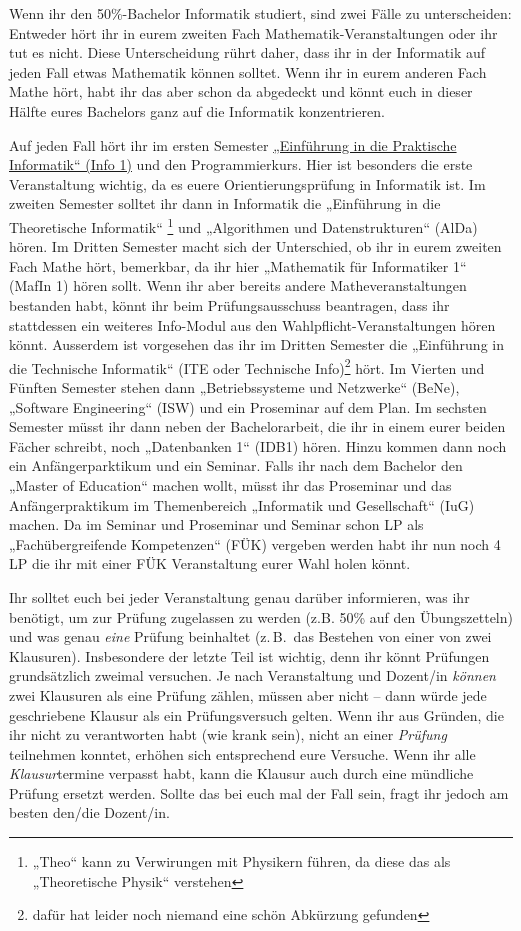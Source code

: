 Wenn ihr den 50\%-Bachelor Informatik studiert, sind zwei Fälle zu
unterscheiden: Entweder hört ihr in eurem zweiten Fach
Mathematik-Veranstaltungen oder ihr tut es nicht. Diese Unterscheidung rührt
daher, dass ihr in der Informatik auf jeden Fall etwas Mathematik können
solltet. Wenn ihr in eurem anderen Fach Mathe hört, habt ihr das aber schon da
abgedeckt und könnt euch in dieser Hälfte eures Bachelors ganz auf die
Informatik konzentrieren.

Auf jeden Fall hört ihr im ersten Semester \hyperref[info1]{„Einführung in die
Praktische Informatik“ (Info 1)} und den Programmierkurs. Hier ist besonders
die erste Veranstaltung wichtig, da es euere Orientierungsprüfung in Informatik
ist. Im zweiten Semester solltet ihr dann in Informatik die „Einführung in die
Theoretische Informatik“ \footnote{„Theo“ kann zu Verwirungen mit Physikern
führen, da diese das als „Theoretische Physik“ verstehen} und „Algorithmen und
Datenstrukturen“ (AlDa) hören. Im Dritten Semester macht sich der Unterschied,
ob ihr in eurem zweiten Fach Mathe hört, bemerkbar, da ihr hier
„Mathematik für Informatiker 1“ (MafIn 1)  hören sollt.  Wenn ihr aber bereits
andere Matheveranstaltungen bestanden habt, könnt ihr beim Prüfungsausschuss
beantragen, dass ihr stattdessen ein weiteres Info-Modul aus den
Wahlpflicht-Veranstaltungen hören könnt.  Ausserdem ist vorgesehen das ihr im
Dritten Semester die „Einführung in die Technische Informatik“ (ITE oder
Technische Info)\footnote{dafür hat leider noch niemand eine schön Abkürzung
gefunden} hört.  Im Vierten und Fünften Semester stehen dann „Betriebssysteme
und Netzwerke“ (BeNe), „Software Engineering“ (ISW) und ein Proseminar auf dem
Plan. Im sechsten Semester müsst ihr dann neben der Bachelorarbeit, die ihr in
einem eurer beiden Fächer schreibt, noch „Datenbanken 1“ (IDB1) hören. Hinzu
kommen dann noch ein Anfängerparktikum und ein Seminar. Falls ihr nach dem
Bachelor den „Master of Education“ machen wollt, müsst ihr das Proseminar und
das Anfängerpraktikum im Themenbereich „Informatik und Gesellschaft“ (IuG)
machen.  Da im Seminar und Proseminar und Seminar schon LP als
„Fachübergreifende Kompetenzen“ (FÜK) vergeben werden habt ihr nun noch 4 LP
die ihr mit einer FÜK Veranstaltung eurer Wahl holen könnt.

Ihr solltet euch bei jeder Veranstaltung genau darüber informieren, was ihr
benötigt, um zur Prüfung zugelassen zu werden (z.B. 50\% auf den Übungszetteln)
und was genau \emph{eine} Prüfung beinhaltet (z.\,B.\ das Bestehen von einer von
zwei Klausuren). Insbesondere der letzte Teil ist wichtig, denn ihr könnt
Prüfungen grundsätzlich zweimal versuchen. Je nach Veranstaltung und Dozent/in
\emph{können} zwei Klausuren als eine Prüfung zählen, müssen aber nicht -- dann
würde jede geschriebene Klausur als ein Prüfungsversuch gelten. Wenn ihr aus
Gründen, die ihr nicht zu verantworten habt (wie krank sein), nicht an einer
\emph{Prüfung} teilnehmen konntet, erhöhen sich entsprechend eure Versuche.
Wenn ihr alle \emph{Klausur}termine verpasst habt, kann die Klausur auch durch
eine mündliche Prüfung ersetzt werden. Sollte das bei euch mal der Fall sein,
fragt ihr jedoch am besten den/die Dozent/in.

